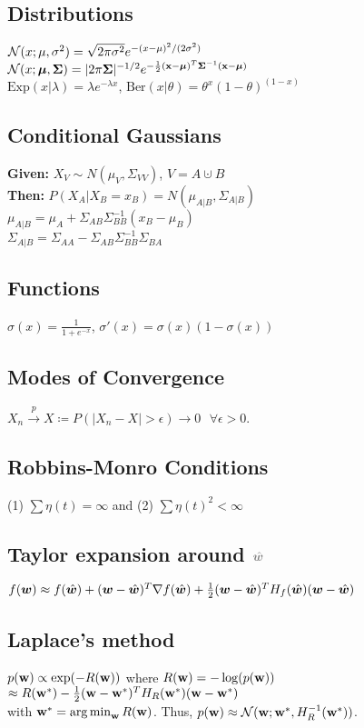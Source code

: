 \subsection*{Distributions}
$\mathcal{N}(x;\mu, \sigma^2)=\sqrt{2\pi\sigma^2}e^{-(x-\mu)^2/(2\sigma^2)}$\\
$\mathcal{N}(x;\bm{\mu}, \bm{\Sigma})= |2\pi\bm{\Sigma}|^{-1/2} e^{-\frac{1}{2}(\mathbf{x}-\bm{\mu})^T\bm{\Sigma}^{-1}(\mathbf{x}-\bm{\mu})} $\\
$\mathrm{Exp}(x|\lambda){=}\lambda e^{-\lambda x}$, $\mathrm{Ber}(x|\theta){=}\theta^x (1{-}\theta)^{(1-x)}$

\subsection*{Conditional Gaussians}
\textbf{Given:} $X_V \sim N(\mu_V, \Sigma_{VV})$, $V=A\cupdot B$\\
\textbf{Then:} $P(X_A|X_B=x_B)=N(\mu_{A|B}, \Sigma_{A|B})$\\
$\mu_{A|B}=\mu_A+\Sigma_{AB}\Sigma^{-1}_{BB}(x_B-\mu_B)$\\
$\Sigma_{A|B}=\Sigma_{AA}-\Sigma_{AB}\Sigma^{-1}_{BB}\Sigma_{BA}$

\subsection*{Functions}
$\sigma(x)=\frac{1}{1+e^{-x}}$, $\sigma'(x)=\sigma(x)(1-\sigma(x))$

\subsection*{Modes of Convergence}
$X_n \overset{p}{\to} X \coloneqq P(|X_n-X|>\epsilon){\to} 0 \,\,\,\,\forall \epsilon > 0$.

\subsection*{Robbins-Monro Conditions}
(1) $\sum\eta(t) = \infty$ and (2) $\sum\eta(t)^2 < \infty$

\subsection*{Taylor expansion {\color{gray} around $\color{gray}\hat\vw$}}
$f({\bm{w}}) \approx f(\hat{{\bm{w}}}) + ({\bm{w}} - \hat{{\bm{w}}})^T \nabla f(\hat{{\bm{w}}}) + \frac{1}{2}({\bm{w}}-\hat{{\bm{w}}})^TH_f(\hat{{\bm{w}}})({\bm{w}}-\hat{{\bm{w}}})$

\subsection*{Laplace's method}
$p({\mathbf{w}}) \propto \exp(-R({\mathbf{w}}))$ where $R({\mathbf{w}}) = -\log(p({\mathbf{w}}))$\\ $\approx R({\mathbf{w}}^*) - \frac{1}{2}({\mathbf{w}}-{\mathbf{w}}^*)^TH_R({\mathbf{w}}^*)({\mathbf{w}}-{\mathbf{w}}^*)$\\ with ${\mathbf{w}}^* = \operatorname*{arg\,min}_{\mathbf{w}} R({\mathbf{w}})$. Thus, $p({\mathbf{w}}) \approx \mathcal{N}({\mathbf{w}};{\mathbf{w}}^*, H_R^{-1}({\mathbf{w}}^*))$.

